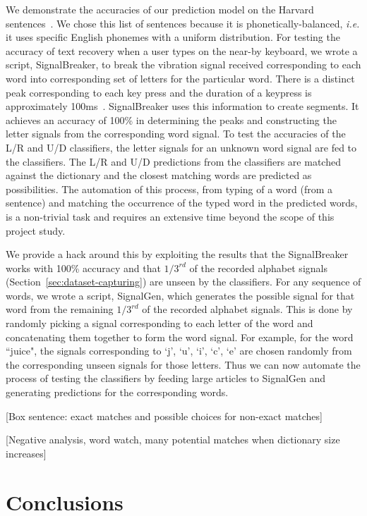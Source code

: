 \documentclass[11pt,conference]{IEEEtran}
\begin{document}
We demonstrate the accuracies of our prediction model on the Harvard
sentences~\cite{harvard-sentences}. We chose this list of sentences because
it is phonetically-balanced, \emph{i.e.} it uses specific English phonemes
with a uniform distribution. For testing the accuracy of text recovery when
a user types on the near-by keyboard, we wrote a script, SignalBreaker, to break the vibration
signal received corresponding to each word into corresponding set of letters for
the particular word. There is a distinct peak corresponding to each key press and
the duration of a keypress is approximately 100ms~\cite{spiphone}. SignalBreaker
uses this information to create segments. It achieves an accuracy of 100\% in
determining the peaks and constructing the letter signals from the corresponding word
signal. To test the accuracies of the L/R and U/D classifiers, the letter signals
for an unknown word signal are fed to the classifiers. The L/R and U/D predictions
from the classifiers are matched against the dictionary and the closest matching
words are predicted as possibilities. The automation of this process, from typing
of a word (from a sentence) and matching the occurrence of the typed word in the
predicted words, is a non-trivial task and requires an extensive time beyond the scope
of this project study.

We provide a hack around this by exploiting the results that
the SignalBreaker works with 100\% accuracy and that $1/3^{rd}$ of the recorded
alphabet signals (Section~\ref{sec:dataset-capturing}) are unseen by the classifiers.
For any sequence of words, we wrote a script, SignalGen, which generates the possible
signal for that word from the remaining $1/3^{rd}$ of the recorded alphabet signals.
This is done by randomly picking a signal corresponding to each letter of the word
and concatenating them together to form the word signal. For example, for the word
``juice", the signals corresponding to `j', `u', `i', `c', `e' are chosen randomly
from the corresponding unseen signals for those letters. Thus we can now automate
the process of testing the classifiers by feeding large articles to SignalGen
and generating predictions for the corresponding words.


 


[Box sentence: exact matches and possible choices for non-exact matches]

[Negative analysis, word watch, many potential matches  when dictionary size increases]


\section{Conclusions}
\end{document}
